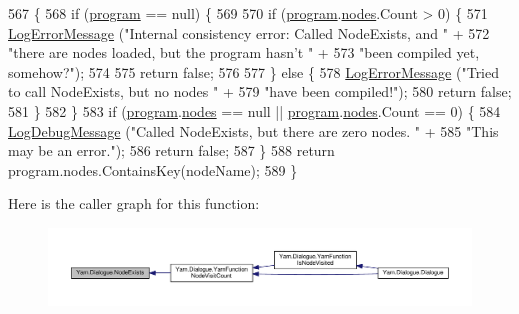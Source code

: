 \begin{DoxyCode}
567                                                 \{
568             \textcolor{keywordflow}{if} (\hyperlink{a00082_a0a1cca92325f430425d784d416cb5c2b}{program} == null) \{
569 
570                 \textcolor{keywordflow}{if} (\hyperlink{a00082_a0a1cca92325f430425d784d416cb5c2b}{program}.\hyperlink{a00142_a3f4928a577c88263ad016be259b175c4}{nodes}.Count > 0) \{
571                     \hyperlink{a00082_a9801e83dd044d6498fdf6ebcc6bec5ac}{LogErrorMessage} (\textcolor{stringliteral}{"Internal consistency error: Called NodeExists, and "} +
572                                      \textcolor{stringliteral}{"there are nodes loaded, but the program hasn't "} +
573                                      \textcolor{stringliteral}{"been compiled yet, somehow?"});
574 
575                     \textcolor{keywordflow}{return} \textcolor{keyword}{false};
576 
577                 \} \textcolor{keywordflow}{else} \{
578                     \hyperlink{a00082_a9801e83dd044d6498fdf6ebcc6bec5ac}{LogErrorMessage} (\textcolor{stringliteral}{"Tried to call NodeExists, but no nodes "} +
579                                      \textcolor{stringliteral}{"have been compiled!"});
580                     \textcolor{keywordflow}{return} \textcolor{keyword}{false};
581                 \}
582             \}
583             \textcolor{keywordflow}{if} (\hyperlink{a00082_a0a1cca92325f430425d784d416cb5c2b}{program}.\hyperlink{a00142_a3f4928a577c88263ad016be259b175c4}{nodes} == null || \hyperlink{a00082_a0a1cca92325f430425d784d416cb5c2b}{program}.\hyperlink{a00142_a3f4928a577c88263ad016be259b175c4}{nodes}.Count == 0) \{
584                 \hyperlink{a00082_a381f48bb0fbb294f8cf44ca57f11be31}{LogDebugMessage} (\textcolor{stringliteral}{"Called NodeExists, but there are zero nodes. "} +
585                                  \textcolor{stringliteral}{"This may be an error."});
586                 \textcolor{keywordflow}{return} \textcolor{keyword}{false};
587             \}
588             \textcolor{keywordflow}{return} program.nodes.ContainsKey(nodeName);
589         \}
\end{DoxyCode}


Here is the caller graph for this function\-:
\nopagebreak
\begin{figure}[H]
\begin{center}
\leavevmode
\includegraphics[width=350pt]{a00082_a93bb76a1f9a4058f225ff4cee97483c6_icgraph}
\end{center}
\end{figure}


